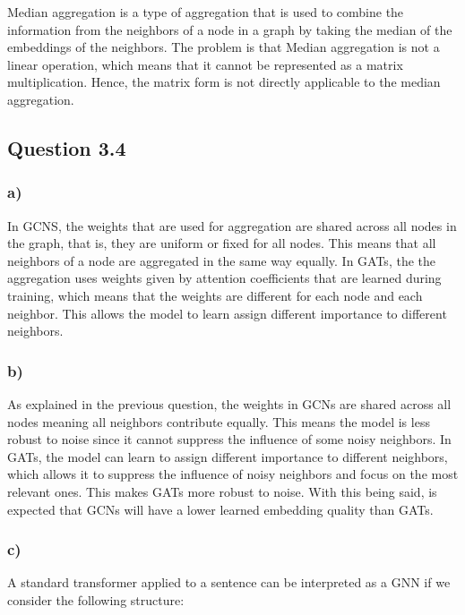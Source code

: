 \documentclass{article}
\begin{document}
Median aggregation is a type of aggregation that is used to combine the information from the neighbors of a node in a graph
by taking the median of the embeddings of the neighbors. The problem is that Median aggregation is not a linear
operation, which means that it cannot be represented as a matrix multiplication. Hence, the matrix form is not
directly applicable to the median aggregation.

\subsection*{Question 3.4}

\subsubsection*{a)}

In GCNS, the weights that are used for aggregation are shared across all nodes in the graph, that is, they are uniform
or fixed for all nodes. This means that all neighbors of a node are aggregated in the same way equally. In GATs,
the the aggregation uses weights given by attention coefficients that are learned during training, which means that
the weights are different for each node and each neighbor. This allows the model to learn assign different importance
to different neighbors. 

\subsubsection*{b)}

As explained in the previous question, the weights in GCNs are shared across all nodes meaning all neighbors contribute equally. This means the model is
less robust to noise since it cannot suppress the influence of some noisy neighbors. In GATs, the model can learn to assign
different importance to different neighbors, which allows it to suppress the influence of noisy neighbors and focus on the
most relevant ones. This makes GATs more robust to noise. With this being said, is expected that GCNs will have a lower
learned embedding quality than GATs.

\subsubsection*{c)}

A standard transformer applied to a sentence can be interpreted as a GNN if we consider the following structure: 
\end{document}
